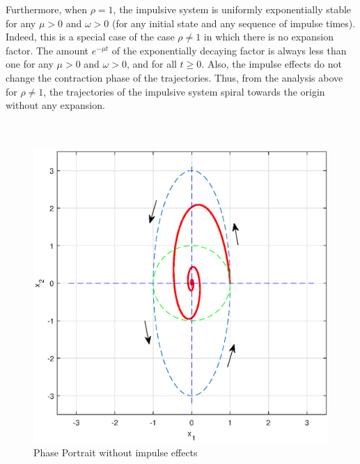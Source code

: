 \documentclass[11pt,a4paper]{article}
\begin{document}
Furthermore, when $\rho = 1$, the impulsive system is uniformly exponentially stable for any $\mu > 0$ and $\omega > 0$ (for any initial state and any sequence of impulse times). Indeed, this is a special case of the case $\rho \neq 1$ in which there is no expansion factor. The amount $e^{-\mu t}$ of the exponentially decaying factor is always less than one for any $\mu > 0$ and $\omega > 0$, and for all $t \geq 0$. Also, the impulse effects do not change the contraction phase of the trajectories.  Thus, from the analysis above for $\rho \neq 1$, the trajectories of the impulsive system spiral towards the origin without any expansion.\\
\\
\\

\begin{figure}
\centering
\includegraphics[scale=0.6]{FG1A.eps} 
\caption{Phase Portrait without impulse effects}
\end{figure}
\end{document}
